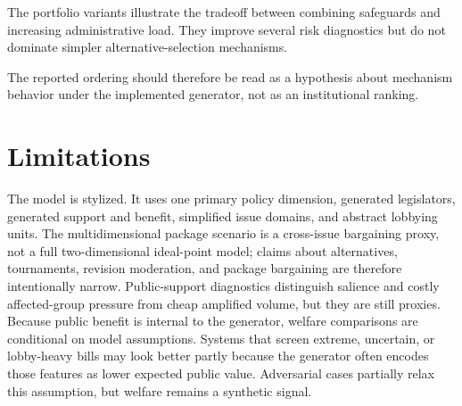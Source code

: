 \documentclass[manuscript]{acmart}
\begin{document}
The portfolio variants illustrate the tradeoff between combining safeguards and increasing administrative load. They improve several risk diagnostics but do not dominate simpler alternative-selection mechanisms.





The reported ordering should therefore be read as a hypothesis about mechanism behavior under the implemented generator, not as an institutional ranking.

\section{Limitations}

The model is stylized. It uses one primary policy dimension, generated legislators, generated support and benefit, simplified issue domains, and abstract lobbying units. The multidimensional package scenario is a cross-issue bargaining proxy, not a full two-dimensional ideal-point model; claims about alternatives, tournaments, revision moderation, and package bargaining are therefore intentionally narrow. Public-support diagnostics distinguish salience and costly affected-group pressure from cheap amplified volume, but they are still proxies. Because public benefit is internal to the generator, welfare comparisons are conditional on model assumptions. Systems that screen extreme, uncertain, or lobby-heavy bills may look better partly because the generator often encodes those features as lower expected public value. Adversarial cases partially relax this assumption, but welfare remains a synthetic signal.
\end{document}
